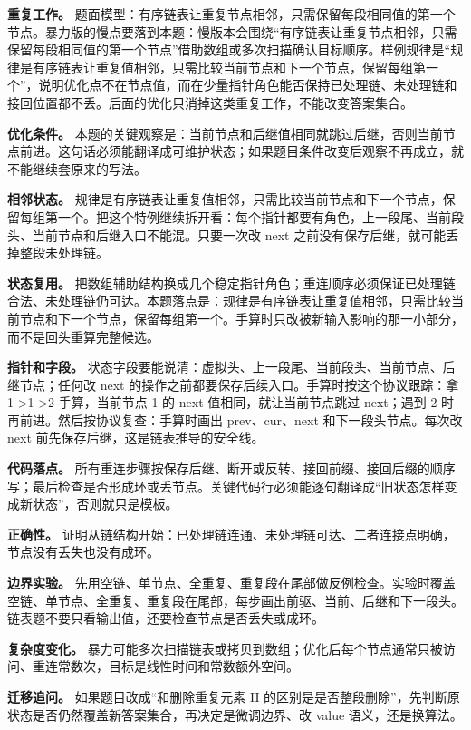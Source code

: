 \textbf{重复工作。} 题面模型：有序链表让重复节点相邻，只需保留每段相同值的第一个节点。暴力版的慢点要落到本题：慢版本会围绕“有序链表让重复节点相邻，只需保留每段相同值的第一个节点”借助数组或多次扫描确认目标顺序。样例规律是“规律是有序链表让重复值相邻，只需比较当前节点和下一个节点，保留每组第一个”，说明优化点不在节点值，而在少量指针角色能否保持已处理链、未处理链和接回位置都不丢。后面的优化只消掉这类重复工作，不能改变答案集合。

\textbf{优化条件。} 本题的关键观察是：当前节点和后继值相同就跳过后继，否则当前节点前进。这句话必须能翻译成可维护状态；如果题目条件改变后观察不再成立，就不能继续套原来的写法。

\textbf{相邻状态。} 规律是有序链表让重复值相邻，只需比较当前节点和下一个节点，保留每组第一个。把这个特例继续拆开看：每个指针都要有角色，上一段尾、当前段头、当前节点和后继入口不能混。只要一次改 next 之前没有保存后继，就可能丢掉整段未处理链。

\textbf{状态复用。} 把数组辅助结构换成几个稳定指针角色；重连顺序必须保证已处理链合法、未处理链仍可达。本题落点是：规律是有序链表让重复值相邻，只需比较当前节点和下一个节点，保留每组第一个。手算时只改被新输入影响的那一小部分，而不是回头重算完整候选。

\textbf{指针和字段。} 状态字段要能说清：虚拟头、上一段尾、当前段头、当前节点、后继节点；任何改 next 的操作之前都要保存后续入口。手算时按这个协议跟踪：拿 1->1->2 手算，当前节点 1 的 next 值相同，就让当前节点跳过 next；遇到 2 时再前进。然后按协议复查：手算时画出 prev、cur、next 和下一段头节点。每次改 next 前先保存后继，这是链表推导的安全线。

\textbf{代码落点。} 所有重连步骤按保存后继、断开或反转、接回前缀、接回后缀的顺序写；最后检查是否形成环或丢节点。关键代码行必须能逐句翻译成“旧状态怎样变成新状态”，否则就只是模板。

\textbf{正确性。} 证明从链结构开始：已处理链连通、未处理链可达、二者连接点明确，节点没有丢失也没有成环。

\textbf{边界实验。} 先用空链、单节点、全重复、重复段在尾部做反例检查。实验时覆盖空链、单节点、全重复、重复段在尾部，每步画出前驱、当前、后继和下一段头。链表题不要只看输出值，还要检查节点是否丢失或成环。

\textbf{复杂度变化。} 暴力可能多次扫描链表或拷贝到数组；优化后每个节点通常只被访问、重连常数次，目标是线性时间和常数额外空间。

\textbf{迁移追问。} 如果题目改成“和删除重复元素 II 的区别是是否整段删除”，先判断原状态是否仍然覆盖新答案集合，再决定是微调边界、改 value 语义，还是换算法。


